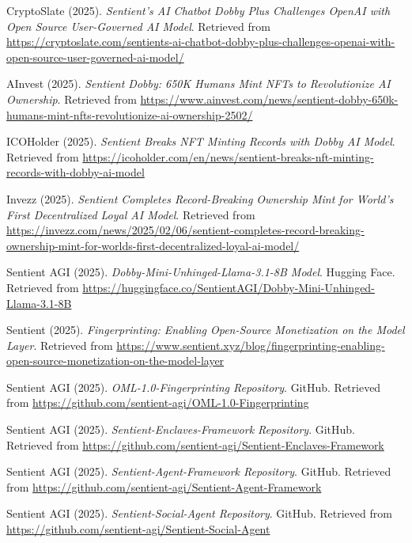 \documentclass[10pt,a4paper]{article}
\begin{document}
\begin{thebibliography}{99}
CryptoSlate (2025).
\textit{Sentient's AI Chatbot Dobby Plus Challenges OpenAI with Open Source User-Governed AI Model}.
Retrieved from \url{https://cryptoslate.com/sentients-ai-chatbot-dobby-plus-challenges-openai-with-open-source-user-governed-ai-model/}

AInvest (2025).
\textit{Sentient Dobby: 650K Humans Mint NFTs to Revolutionize AI Ownership}.
Retrieved from \url{https://www.ainvest.com/news/sentient-dobby-650k-humans-mint-nfts-revolutionize-ai-ownership-2502/}

ICOHolder (2025).
\textit{Sentient Breaks NFT Minting Records with Dobby AI Model}.
Retrieved from \url{https://icoholder.com/en/news/sentient-breaks-nft-minting-records-with-dobby-ai-model}

Invezz (2025).
\textit{Sentient Completes Record-Breaking Ownership Mint for World's First Decentralized Loyal AI Model}.
Retrieved from \url{https://invezz.com/news/2025/02/06/sentient-completes-record-breaking-ownership-mint-for-worlds-first-decentralized-loyal-ai-model/}

Sentient AGI (2025).
\textit{Dobby-Mini-Unhinged-Llama-3.1-8B Model}.
Hugging Face. Retrieved from \url{https://huggingface.co/SentientAGI/Dobby-Mini-Unhinged-Llama-3.1-8B}

Sentient (2025).
\textit{Fingerprinting: Enabling Open-Source Monetization on the Model Layer}.
Retrieved from \url{https://www.sentient.xyz/blog/fingerprinting-enabling-open-source-monetization-on-the-model-layer}

Sentient AGI (2025).
\textit{OML-1.0-Fingerprinting Repository}.
GitHub. Retrieved from \url{https://github.com/sentient-agi/OML-1.0-Fingerprinting}

Sentient AGI (2025).
\textit{Sentient-Enclaves-Framework Repository}.
GitHub. Retrieved from \url{https://github.com/sentient-agi/Sentient-Enclaves-Framework}

Sentient AGI (2025).
\textit{Sentient-Agent-Framework Repository}.
GitHub. Retrieved from \url{https://github.com/sentient-agi/Sentient-Agent-Framework}

Sentient AGI (2025).
\textit{Sentient-Social-Agent Repository}.
GitHub. Retrieved from \url{https://github.com/sentient-agi/Sentient-Social-Agent}

\end{thebibliography}
\end{document}
